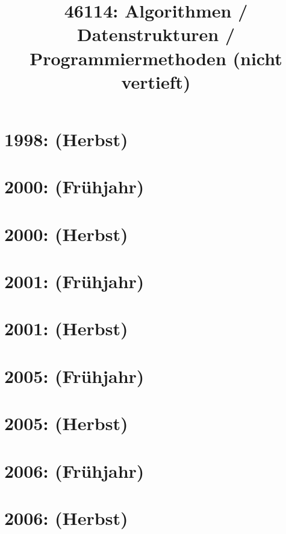\documentclass{lehramt-informatik-haupt}
\title{46114: Algorithmen / Datenstrukturen / Programmiermethoden (nicht vertieft)}
\begin{document}
\maketitle
\tableofcontents

\section{1998: (Herbst)}


\section{2000: (Frühjahr)}


\section{2000: (Herbst)}


\section{2001: (Frühjahr)}


\section{2001: (Herbst)}


\section{2005: (Frühjahr)}


\section{2005: (Herbst)}


\section{2006: (Frühjahr)}


\section{2006: (Herbst)}

\end{document}
